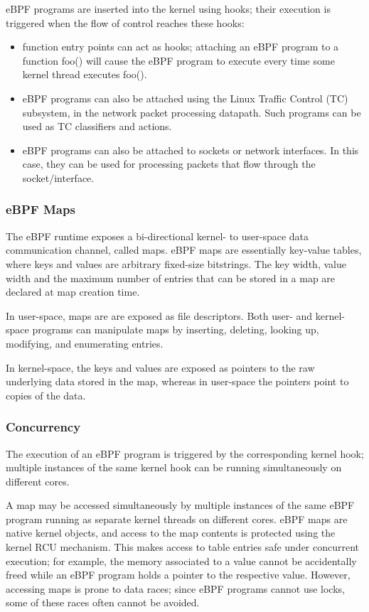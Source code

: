 eBPF programs are inserted into the kernel using hooks; their
execution is triggered when the flow of control reaches these hooks:


\begin{itemize}
\item function entry points can act as hooks; attaching an eBPF
  program to a function foo() will cause the eBPF program to execute
  every time some kernel thread executes foo().

\item eBPF programs can also be attached using the Linux Traffic
  Control (TC) subsystem, in the network packet processing
  datapath. Such programs can be used as TC classifiers and actions.

\item eBPF programs can also be attached to sockets or network
  interfaces. In this case, they can be used for processing packets
  that flow through the socket/interface.
\end{itemize}

\subsubsection{eBPF Maps}

The eBPF runtime exposes a bi-directional kernel- to user-space data
communication channel, called maps.  eBPF maps are essentially
key-value tables, where keys and values are arbitrary fixed-size
bitstrings.  The key width, value width and the maximum number of
entries that can be stored in a map are declared at map creation time.

In user-space, maps are are exposed as file descriptors. Both user- and
kernel-space programs can manipulate maps by inserting, deleting,
looking up, modifying, and enumerating entries.

In kernel-space, the keys and values are exposed as pointers to the raw
underlying data stored in the map, whereas in user-space the
pointers point to copies of the data.

\subsubsection{Concurrency}

The execution of an eBPF program is triggered by the corresponding
kernel hook; multiple instances of the same kernel hook can be running
simultaneously on different cores.

A map may be accessed simultaneously by multiple instances of the same
eBPF program running as separate kernel threads on different cores.
eBPF maps are native kernel objects, and access to the map contents is
protected using the kernel RCU mechanism. This makes access to table
entries safe under concurrent execution; for example, the memory
associated to a value cannot be accidentally freed while an eBPF
program holds a pointer to the respective value.  However, accessing
maps is prone to data races; since eBPF programs cannot use locks,
some of these races often cannot be avoided.

